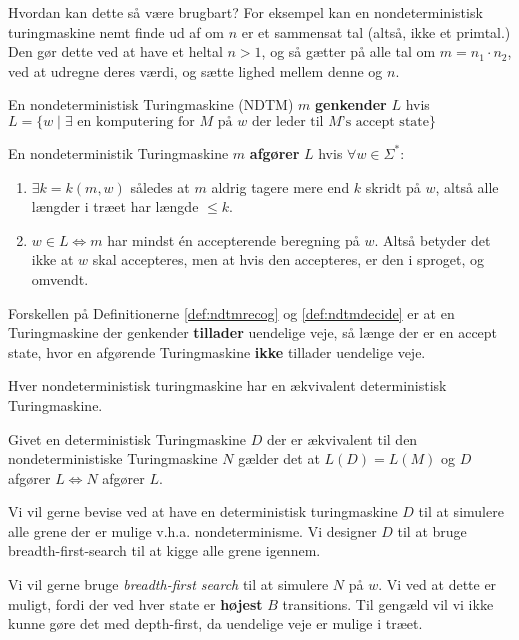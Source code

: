 Hvordan kan dette så være brugbart? For eksempel kan en nondeterministisk turingmaskine nemt finde ud af om $n$ er et sammensat tal (altså, ikke et primtal.) Den gør dette ved at have et heltal $n > 1$, og så gætter på alle tal om $m = n_{1} \cdot n_{2}$, ved at udregne deres værdi, og sætte lighed mellem denne og $n$.


\begin{definition}
	\label{def:ndtmrecog}
	En nondeterministisk Turingmaskine (NDTM) $m$ \textbf{genkender} $L$ hvis $L = \{w \mid \exists \text{ en komputering for }M \text{ på } w \text{ der leder til } M \text{'s accept state} \}$
\end{definition}

\begin{definition}
	\label{def:ndtmdecide}
	En nondeterministik Turingmaskine $m$ \textbf{afgører} $L$ hvis $\forall w \in \Sigma^{*}$:
	\begin{enumerate}
		\item $\exists k = k(m,w)$ således at $m$ aldrig tagere mere end $k$ skridt på $w$, altså alle længder i træet har længde $\leq k$.
		\item $w \in L \iff m$  har mindst én accepterende beregning på $w$. Altså betyder det ikke at $w$ skal accepteres, men at hvis den accepteres, er den i sproget, og omvendt.
	\end{enumerate}
\end{definition}

Forskellen på Definitionerne \ref{def:ndtmrecog} og \ref{def:ndtmdecide} er at en Turingmaskine der genkender \textbf{tillader} uendelige veje, så længe der er en accept state, hvor en afgørende Turingmaskine \textbf{ikke} tillader uendelige veje.

\begin{theorem}
	\label{teo:nondeterminismturingequiv}
	Hver nondeterministisk turingmaskine har en ækvivalent deterministisk Turingmaskine.
\end{theorem}

Givet en deterministisk Turingmaskine $D$ der er ækvivalent til den nondeterministiske Turingmaskine $N$ gælder det at $L(D) = L(M)$ og $D$ afgører $L \iff N$ afgører $L$.

Vi vil gerne bevise ved at have en deterministisk turingmaskine $D$ til at simulere alle grene der er mulige v.h.a. nondeterminisme. Vi designer $D$ til at bruge breadth-first-search til at kigge alle grene igennem.

Vi vil gerne bruge \textit{breadth-first search} til at simulere $N$ på $w$. Vi ved at dette er muligt, fordi der ved hver state er \textbf{højest} $B$ transitions. Til gengæld vil vi ikke kunne gøre det med depth-first, da uendelige veje er mulige i træet.

